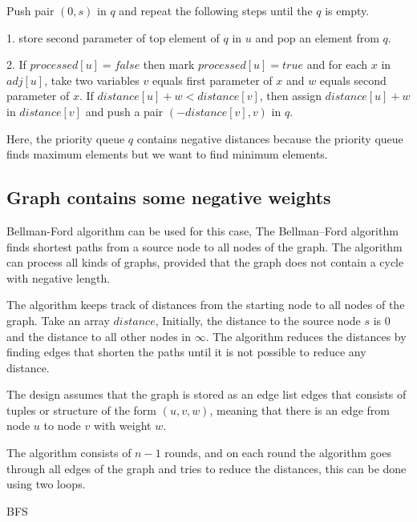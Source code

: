 \documentclass[conference]{IEEEtran}
\begin{document}
Push pair $(0,s)$ in $q$ and repeat the following steps until the $q$ is empty.

1.  store second parameter of top element of $q$ in $u$ and pop an element from $q$.

2. If $processed[u]=false$ then mark $processed[u]=true$ and for each $x$ in $adj[u]$, take two variables $v$ equals first parameter of $x$ and $w$ equals second parameter of $x$. If $distance[u]+w<distance[v]$, then assign $distance[u]+w$ in $distance[v]$ and push a pair $(-distance[v],v)$ in $q$.


Here, the priority queue $q$ contains negative distances because the priority queue finds maximum elements but we want to find minimum elements.

\subsection{Graph contains some negative weights}

Bellman-Ford algorithm can be used for this case, The Bellman–Ford algorithm finds shortest paths from a source node to all
nodes of the graph. The algorithm can process all kinds of graphs, provided that
the graph does not contain a cycle with negative length.


The algorithm keeps track of distances from the starting node to all nodes
of the graph.
Take an array $distance$, Initially, the distance to the source node $s$ is $0$ and the distance to
all other nodes in $\infty$. The algorithm reduces the distances by finding edges
that shorten the paths until it is not possible to reduce any distance.

The design assumes that the graph is stored as an edge list edges that consists of tuples or structure of the form
$( u, v, w )$, meaning that there is an edge from node $u$ to node $v$ with weight $w$.

The algorithm consists of $n-1$ rounds, and on each round the algorithm goes
through all edges of the graph and tries to reduce the distances, this can be done using two loops.

\begin{algorithm}[H]
    \caption{BFS}
    \DontPrintSemicolon

    
\end{algorithm}
\end{document}
